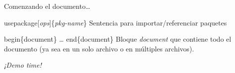 \begin{frame}{Comenzando el documento\ldots}

    \begin{block}{usepackage[\textit{ops}]\{\textit{pkg-name}\}}
        Sentencia para importar/referenciar paquetes
    \end{block}

    \pause
    \vspace{0.75cm}

    \begin{block}{begin\{document\} \ldots{} end\{document\}}
        Bloque \textit{document} que contiene todo el documento (ya sea en un solo archivo o en múltiples archivos).
    \end{block}

    \pause
    \vspace{0.5cm}

    \begin{center}
        \textit{¡Demo time!}
    \end{center}
\end{frame}